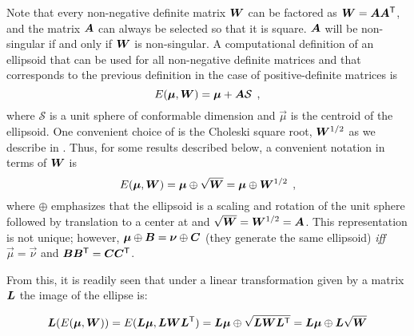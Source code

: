 Note that every non-negative definite matrix $\bm{W}$ can be factored as $\bm{W}=\bm{A}\bm{A}^\mathsf{T}$,
and the matrix $\bm{A}$ can always be selected so that it is square. 
$\bm{A}$ will be non-singular if and only if $\bm{W}$ is non-singular.  
A computational
definition of an ellipsoid that can be used for all non-negative definite matrices and that corresponds to the previous definition in the case of positive-definite matrices is
\begin{equation}
E(\bm{\mu},\bm{W}) = \bm{\mu} + \bm{A} \mathcal{S} \:\: ,
\end{equation}
where $\mathcal{S}$ is a unit sphere of conformable dimension and $\vec{\mu}$ is the centroid of the ellipsoid.
One convenient choice of  is the Choleski square root, $\bm{W}^{1/2}$ as we describe in .
Thus, for some results described below, a convenient notation in terms of $\bm{W}$ is
\begin{equation}\label{eq:ellipsoidW}
E(\bm{\mu}, \bm{W}) = \bm{\mu} \oplus \sqrt{\bm{W}} = \bm{\mu} \oplus \bm{W}^{1/2} \:\: ,
\end{equation} 
where $\oplus$
emphasizes that the ellipsoid is a scaling and rotation of the unit sphere followed by translation to
a center at \vec{\mu} and $\sqrt{\bm{W}}=\bm{W}^{1/2}=\bm{A}$. This representation is not unique;
however,  $\bm{\mu} \oplus \bm{B} = \bm{\nu} \oplus \bm{C}$ (they generate the same ellipsoid)
\emph{iff} $\vec{\mu} = \vec{\nu}$ and $\bm{B}\bm{B}^\mathsf{T} = \bm{C}\bm{C}^\mathsf{T}$.

From this, it is readily seen that under a linear transformation given by a matrix
$\bm{L}$
the image of the ellipse is:

\begin{equation*}
\bm{L}(E(\bm{\mu} ,\bm{W}))=E(\bm{L}\bm{\mu} ,\bm{L}\bm{W}{\bm{L}}^\mathsf{T})=\bm{L}\bm{\mu} \oplus \sqrt{\bm{L}\bm{W}{\bm{L}}^\mathsf{T}}=\bm{L}\bm{\mu} \oplus \bm{L}\sqrt{\bm{W}}
\end{equation*}

